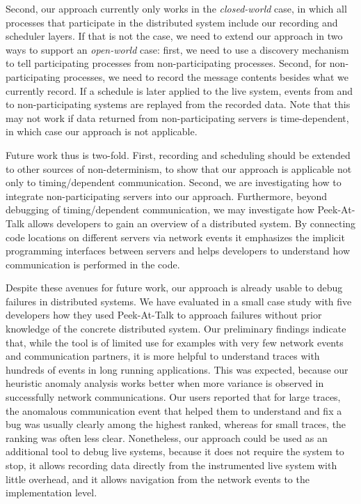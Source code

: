 \documentclass[preprint,3p]{elsarticle}
\newcommand{\toolname}{Peek-At-Talk\xspace}
\begin{document}
Second, our approach currently only works in the \emph{closed-world} case, in
which all processes that participate in the distributed system include our
recording and scheduler layers. If that is not the case, we need to extend our
approach in two ways to support an \emph{open-world} case: first, we need to use
a discovery mechanism to tell participating processes from non-participating
processes. Second, for non-participating processes, we need to record the
message contents besides what we currently record. If a schedule is later
applied to the live system, events from and to non-participating systems are
replayed from the recorded data. Note that this may not work if data returned
from non-participating servers is time-dependent, in which case our approach is
not applicable.

Future work thus is two-fold. First, recording and scheduling should be extended
to other sources of non-determinism, to show that our approach is applicable not
only to timing\-/dependent communication. Second, we are investigating how to
integrate non-participating servers into our approach. Furthermore, beyond
debugging of timing\-/dependent communication, we may investigate how \toolname
allows developers to gain an overview of a distributed system. By connecting
code locations on different servers via network events it emphasizes the
implicit programming interfaces between servers and helps developers to
understand how communication is performed in the code.

Despite these avenues for future work, our approach is already usable to debug
failures in distributed systems. We have evaluated in a small case study with
five developers how they used \toolname to approach failures without prior
knowledge of the concrete distributed system. Our preliminary findings indicate
that, while the tool is of limited use for examples with very few network events
and communication partners, it is more helpful to understand traces with
hundreds of events in long running applications. This was expected, because our
heuristic anomaly analysis works better when more variance is observed in
successfully network communications. Our users reported that for large traces,
the anomalous communication event that helped them to understand and fix a bug
was usually clearly among the highest ranked, whereas for small traces, the
ranking was often less clear. Nonetheless, our approach could be used as an
additional tool to debug live systems, because it does not require the system to
stop, it allows recording data directly from the instrumented live system with
little overhead, and it allows navigation from the network events to the
implementation level.


% 
% 
% 
% 
% 



\end{document}
